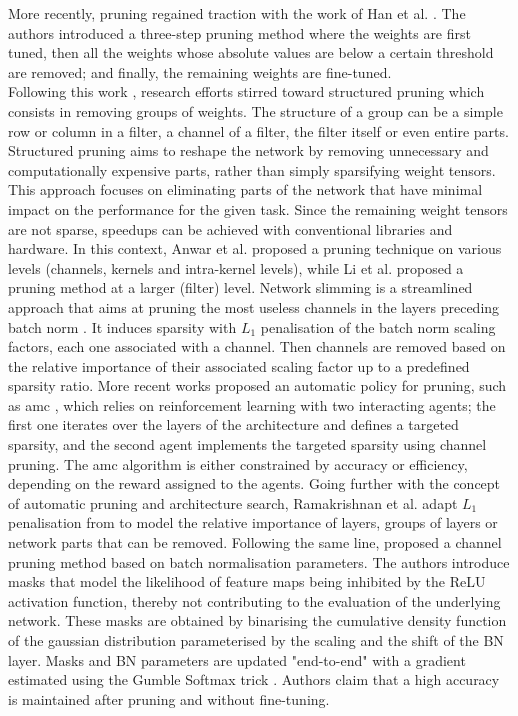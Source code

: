 More recently, pruning regained traction with the work of Han et al.
\cite{DBLP:conf/nips/HanPTD15}. The authors introduced a three-step pruning
method where the weights are first tuned, then all the weights whose absolute
values are below a certain threshold are removed; and finally, the remaining weights
are fine-tuned. \\


Following this work \cite{DBLP:conf/nips/HanPTD15}, research efforts stirred
toward structured pruning which consists in removing groups of weights. The
structure of a group can be a simple row or column in a filter, a channel of a
filter, the filter itself or even entire parts. Structured pruning aims to
reshape the network by removing unnecessary and computationally expensive
parts, rather than simply sparsifying weight tensors. This approach focuses
on eliminating parts of the network that have minimal impact on the performance
for the given task. Since the remaining weight tensors are not sparse, speedups
can be achieved with conventional libraries and hardware. In this context, Anwar
et al. \cite{anwar2017structured} proposed a pruning technique on various levels
(channels, kernels and intra-kernel levels), while Li et al.
\cite{DBLP:conf/iclr/0022KDSG17} proposed a pruning method at a larger (filter)
level. Network slimming \cite{DBLP:conf/iccv/LiuLSHYZ17} is a streamlined
approach that aims at pruning the most useless channels in the layers preceding
\ac{batch norm} \cite{DBLP:conf/icml/IoffeS15}. It induces sparsity with $L_1$
penalisation of the \ac{batch norm} scaling factors, each one associated with a
channel. Then channels are removed based on the relative importance of their
associated scaling factor up to a predefined sparsity ratio. More recent works
proposed an automatic policy for pruning, such as \ac{amc}
\cite{DBLP:conf/eccv/HeLLWLH18}, which relies on reinforcement learning with two
interacting agents; the first one iterates over the layers of the architecture
and defines a targeted sparsity, and the second agent implements the targeted
sparsity using channel pruning. The \ac{amc} algorithm is either constrained by
accuracy or efficiency, depending on the reward assigned to the agents. Going
further with the concept of automatic pruning and architecture search,
Ramakrishnan et al. \cite{DBLP:conf/crv/RamakrishnanSN20} adapt $L_1$
penalisation from \cite{DBLP:conf/iccv/LiuLSHYZ17} to model the relative
importance of layers, groups of layers or network parts that can be removed.
Following the same line, \cite{DBLP:conf/icml/KangH20} proposed a channel
pruning method based on batch normalisation parameters. The authors introduce
masks that model the likelihood of feature maps being inhibited by the \ac{ReLU}
activation function, thereby not contributing to the evaluation of the
underlying network. These masks are obtained by binarising the cumulative
density function of the gaussian distribution parameterised by the scaling and
the shift of the BN layer. Masks and BN parameters are updated "end-to-end" with
a gradient estimated using the Gumble Softmax trick
\cite{DBLP:conf/iclr/JangGP17}. Authors claim that a high accuracy is maintained
after pruning and without fine-tuning. \\



